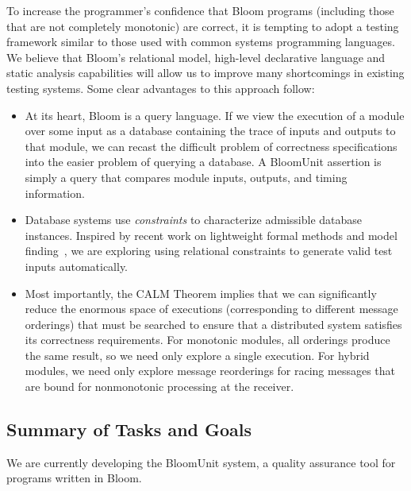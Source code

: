 To increase the programmer's confidence that Bloom programs (including those
that are not completely monotonic) are correct, 
it is tempting to adopt a testing framework similar to those used with common
systems programming languages.  We believe that Bloom's relational model,
high-level declarative language and static analysis capabilities will allow
us to improve many shortcomings in existing testing systems.  Some clear
advantages to this approach follow:

\begin{itemize}
\item At its heart, Bloom is a query language.  If we view the execution
of a module over some input as a database containing the trace of inputs and
outputs to that module, we can recast the difficult problem of correctness 
specifications into the easier problem of querying a database.  A BloomUnit
assertion is simply a query that compares module inputs, outputs, and timing
information.

\item Database systems use \emph{constraints} to characterize admissible 
database instances.  Inspired by recent work on lightweight formal methods and
model finding~\cite{jackson}, we are exploring using relational constraints 
to generate valid test inputs automatically.

\item Most importantly, the CALM Theorem implies that we can significantly
reduce the enormous space of executions (corresponding to different message
orderings) that must be searched to ensure that a distributed system satisfies
its correctness requirements.  For monotonic modules, all orderings produce
the same result, so we need only explore a single execution.  For hybrid
modules, we need only explore message reorderings for racing messages that
are bound for nonmonotonic processing at the receiver.

\end{itemize}



\subsection{Summary of Tasks and Goals}

We are currently developing the BloomUnit system, a quality assurance tool
for programs written in Bloom.  

